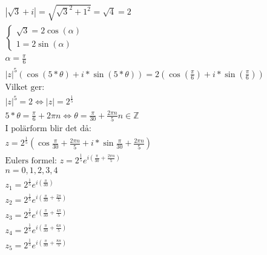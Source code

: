 \begin{multicols}{2}
\begin{align*}
  &\quad |\sqrt{3} + i| = \sqrt{\sqrt{3}^2 + 1^2} = \sqrt{4} = 2 \\
  &\quad \left\{ \begin{array} { l } { \sqrt{3} = 2 \cos(\alpha)} \\ { 1 = 2 \sin(\alpha) } \end{array} \right. \\
  &\quad \alpha = \frac{\pi}{6} \\
  &\quad |z|^5(\cos{(5*\theta)} + i * \sin{(5*\theta)}) = 2(\cos{(\frac{\pi}{6})} + i * \sin{(\frac{\pi}{6})}) \\
  &\quad \text{Vilket ger: } \\
  &\quad |z|^5 = 2 \Leftrightarrow |z| = 2^{\frac{1}{5}} \\
  &\quad 5*\theta = \frac{\pi}{6} + 2 \pi n \Leftrightarrow \theta = \frac{\pi}{30} + \frac{2 \pi n}{5} n \in \mathbb{Z} \\
  &\quad \text{I polärform blir det då: } \\
  &\quad z = 2^{\frac{1}{5}} (\cos{\frac{\pi}{30} + \frac{2 \pi n}{5}} + i * \sin{\frac{\pi}{30} + \frac{2 \pi n}{5}}) \\
  &\quad \text{Eulers formel: } z = 2^{\frac{1}{5}} e^{i (\frac{\pi}{30} + \frac{2 \pi n}{5})} \\
  &\quad n = 0,1,2,3,4 \\
  &\quad z_1 = 2^{\frac{1}{5}} e^{i (\frac{\pi}{30})} \\
  &\quad z_2 = 2^{\frac{1}{5}} e^{i (\frac{\pi}{30} + \frac{2 \pi}{5})} \\
  &\quad z_3 = 2^{\frac{1}{5}} e^{i (\frac{\pi}{30} + \frac{4 \pi}{5})} \\
  &\quad z_4 = 2^{\frac{1}{5}} e^{i (\frac{\pi}{30} + \frac{6 \pi}{5})} \\
  &\quad z_5 = 2^{\frac{1}{5}} e^{i (\frac{\pi}{30} + \frac{8 \pi}{5})} \\
\end{align*}




\end{multicols}
